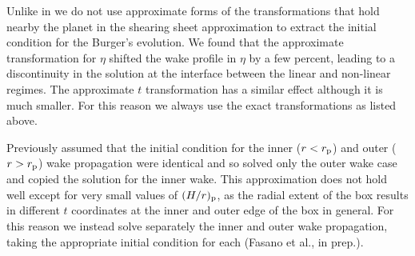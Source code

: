 Unlike in \citet{goodman2001,rafikov2002a,bollati2021} we do not use approximate forms of the transformations that hold nearby the planet in the shearing sheet approximation to extract the initial condition for the Burger's evolution.
We found that the approximate transformation for $\eta$ \citep[Equations 35 in][]{rafikov2002a} shifted the wake profile in $\eta$ by a few percent, leading to a discontinuity in the solution at the interface between the linear and non-linear regimes.
The approximate $t$ transformation has a similar effect although it is much smaller.
For this reason we always use the exact transformations as listed above.

Previously \citet{bollati2021} assumed that the initial condition for the inner ($r<r_{\rm p}$) and outer ($r>r_{\rm p}$) wake propagation were identical and so solved only the outer wake case and copied the solution for the inner wake.
This approximation does not hold well except for very small values of $(H/r)_{\rm p}$, as the radial extent of the box results in different $t$ coordinates at the inner and outer edge of the box in general.
For this reason we instead solve separately the inner and outer wake propagation, taking the appropriate initial condition for each (Fasano et al., in prep.).

